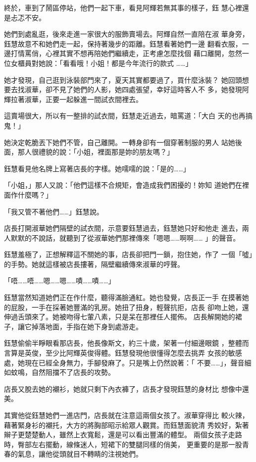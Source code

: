 終於，車到了鬧區停站，他們一起下車，看見阿輝若無其事的樣子，鈺
慧心裡還是忐忑不安。

她們到處亂逛，後來走進一家很大的服飾賣場去。阿輝自然一直陪在淑
華身旁，鈺慧故意不和她們走一起，保持著幾步的距離。鈺慧看著她們一邊
翻看衣服，一邊打情罵俏，心裡其實不想再陪她們繼續走，正考慮怎麼找個
藉口離開，忽然一位女櫃員對她說：「看看哦！小姐！都是今年流行的款式
……」

她才發現，自己逛到泳裝部門來了，夏天其實都要過了，買什麼泳裝？
她回頭想要去找淑華，卻不見了她們的人影，她四處張望，幸好這時客人不
多，她發現阿輝拉著淑華，正要一起躲進一間試衣間裡去。

這賣場很大，所以有一整排的試衣間，鈺慧走近過去，暗罵道：「大白
天的也再搞鬼！」

她決定乾脆丟下她們不管，自己離開。一轉身卻有一個穿著制服的男人
站她後面，那人很禮貌的說：「小姐，裡面那是妳的朋友嗎？」

鈺慧看見他名牌上寫著店長的字樣。她嚅嚅的說：「是的……」

「小姐，」那人又說：「他們這樣不合規矩，會造成我們困擾的！妳知
道她們在裡面作什麼嗎？」

「我又管不著他們……」鈺慧說。

店長打開淑華她們隔壁的試衣間，示意要鈺慧過去，鈺慧她只好和他走
進去，兩人默默的不說話，就聽到了從淑華她們那裡傳來「嗯嗯……啊啊……
」的聲音。

鈺慧羞極了，正想解釋這不關她的事，店長卻把門一鎖，抱住她，作了
一個「噓」的手勢。她就這樣被店長摟著，隔壁繼續傳來淑華的哼聲。

「唔……唔……嗯……嗯……嘖……嘖……」

鈺慧當然知道她們正在作什麼，聽得滿臉通紅。她也發覺，店長正一手
在摸著她的屁股，一手在採著她豐滿的乳房。她扭了扭身，輕聲抗拒，店長
卻吻上她，還伸過舌頭來了。她被吻得七葷八素，只是呆在那裡任人擺佈。
店長解開她的裙子，讓它掉落地面，手指在她下身到處游走。

鈺慧偷偷半睜眼看那店長，他長像斯文，約三十歲，架著一付細邊眼鏡
，整體而言算是英俊，至少比阿輝英俊得體。鈺慧發現他很懂得怎麼去挑弄
女孩的敏感處，她現在已經全身無力，手腳發麻了。只是嘴上仍然說著：「
不要……」，聲音細如蚊鳴，自然阻擋不了店長的攻勢。

店長又脫去她的襯衫，她就只剩下內衣褲了，店長才發現鈺慧的身材比
想像中還美。

其實他從鈺慧她們一進店門，店長就在注意這兩個女孩了。淑華穿得比
較火辣，藉著緊身衫的襯托，大方的將胸部昭示給眾人觀賞。而鈺慧面貌清
秀姣好，紮著辮子更楚楚動人，雖然上衣寬鬆，還是可以看出豐滿的體型。
兩個女孩子走路時，臀部左右擺動，線條迷人，短裙下的雙腿同樣的俏美，
更重要的是那一股青春的氣息，讓他從頭就目不轉睛的注視她們。


